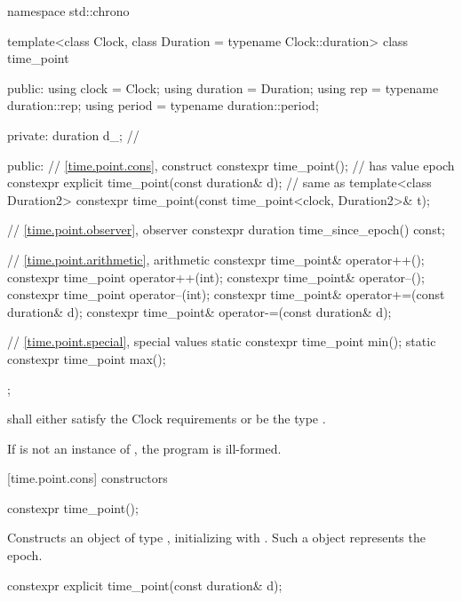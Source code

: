 %
\begin{codeblock}
namespace std::chrono {
  template<class Clock, class Duration = typename Clock::duration>
  class time_point {
  public:
    using clock    = Clock;
    using duration = Duration;
    using rep      = typename duration::rep;
    using period   = typename duration::period;

  private:
    duration d_;                                                // \expos

  public:
    // \ref{time.point.cons}, construct
    constexpr time_point();                                     // has value epoch
    constexpr explicit time_point(const duration& d);           // same as 
    template<class Duration2>
      constexpr time_point(const time_point<clock, Duration2>& t);

    // \ref{time.point.observer}, observer
    constexpr duration time_since_epoch() const;

    // \ref{time.point.arithmetic}, arithmetic
    constexpr time_point& operator++();
    constexpr time_point operator++(int);
    constexpr time_point& operator--();
    constexpr time_point operator--(int);
    constexpr time_point& operator+=(const duration& d);
    constexpr time_point& operator-=(const duration& d);

    // \ref{time.point.special}, special values
    static constexpr time_point min();
    static constexpr time_point max();
  };
}
\end{codeblock}

\pnum
{} shall either
satisfy the Clock requirements
or be the type .

\pnum
If  is not an instance of ,
the program is ill-formed.

[time.point.cons]{ constructors}

%
\begin{itemdecl}
constexpr time_point();
\end{itemdecl}

\begin{itemdescr}
\pnum
\effects Constructs an object of type , initializing
 with . Such a  object
represents the epoch.
\end{itemdescr}

%
\begin{itemdecl}
constexpr explicit time_point(const duration& d);
\end{itemdecl}

